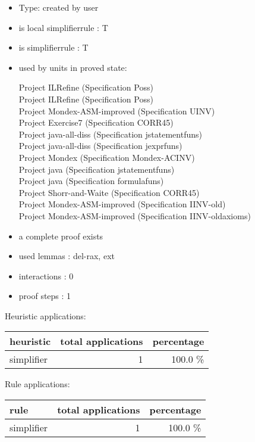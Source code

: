 \documentclass[a4paper]{article}
\begin{document}
\begin{itemize}

\item Type: created by user

\item is local simplifierrule : T
\item is simplifierrule : T
\item used by units in proved state:

Project ILRefine (Specification Poss) \\
Project ILRefine (Specification Poss) \\
Project Mondex-ASM-improved (Specification UINV) \\
Project Exercise7 (Specification CORR45) \\
Project java-all-diss (Specification jstatementfuns) \\
Project java-all-diss (Specification jexprfuns) \\
Project Mondex (Specification Mondex-ACINV) \\
Project java (Specification jstatementfuns) \\
Project java (Specification formulafuns) \\
Project Shorr-and-Waite (Specification CORR45) \\
Project Mondex-ASM-improved (Specification IINV-old) \\
Project Mondex-ASM-improved (Specification IINV-oldaxioms)
\item       a complete proof exists
\item       used lemmas  : del-rax, ext
\item       interactions : 0
\item       proof steps  : 1
\end{itemize}

\medskip


Heuristic applications:

\begin{supertabular}{l|r|r}
heuristic	& total applications & percentage \\ \hline
simplifier & 1 & 100.0 \% \\

\end{supertabular}

Rule applications:

\begin{supertabular}{l|r|r}
rule	        & total applications & percentage \\ \hline
simplifier & 1 & 100.0 \% \\

\end{supertabular}
\end{document}
